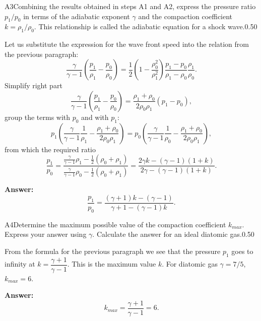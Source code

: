 \documentclass[11pt,a4paper]{article}
\begin{document}
\begin{solcard}{A3}{Combining the results obtained in steps A1 and A2, express the pressure ratio $p_1/p_0$ in terms of the adiabatic exponent $\gamma$ and the compaction coefficient $k=\rho_1/\rho_0$. This relationship is called the adiabatic equation for a shock wave.}{0.50}

Let us substitute the expression for the wave front speed into the relation from the previous paragraph: $$ \frac{\gamma}{\gamma - 1}\left( \frac{p_1}{\rho_1}- \frac{p_0}{\rho_0}\right) = \frac{1}{2}\left(1-\frac{\rho_0^2}{\rho_1^2} \right) \frac{p_1- p_0}{\rho_1 - \rho_0}\frac{\rho_1}{\rho_0}. $$Simplify right part $$ \frac{\gamma}{\gamma - 1}\left( \frac{p_1}{\rho_1}- \frac{p_0}{\rho_0}\right) = \frac{\rho_1 + \rho_0}{2\rho_0 \rho_1} (p_1 - p_0) , $$group the terms with $p_0$ and with $p_1$: $$ p_1\left(\frac{\gamma}{\gamma - 1} \frac{1}{\rho_1} -\frac{\rho_1 + \rho_0}{2 \rho_0 \rho_1} \right) = p_0\left(\frac{\gamma}{\gamma - 1} \frac{1}{\rho_0} - \frac{\rho_1 + \rho_0}{2 \rho_0 \rho_1} \right), $$from which the required ratio $$ \frac{p_1}{p_0}= \frac{\frac{\gamma}{\gamma - 1} \rho_1 - \frac{1}{2}(\rho_0 + \rho_1)}{\frac{\gamma}{\gamma - 1} \rho_0 - \frac{1}{2}(\rho_0 + \rho_1)} = \frac{2 \gamma k - (\gamma -1) (1 + k)}{2 \gamma - (\gamma - 1)(1 + k) }. $$

\par\smallskip\noindent\textbf{Answer:} $$ \frac{p_1}{p_0} = \frac{(\gamma + 1)k  - (\gamma -1)}{\gamma + 1 - (\gamma - 1)k }. $$
\end{solcard}

\begin{solcard}{A4}{Determine the maximum possible value of the compaction coefficient $k_{max}$. Express your answer using $\gamma$. Calculate the answer for an ideal diatomic gas.}{0.50}

From the formula for the previous paragraph we see that the pressure $p_1$ goes to infinity at $k = \dfrac{\gamma + 1}{\gamma -1}$. This is the maximum value $k$. For diatomic gas $\gamma = 7/5$, $k_{max} = 6$.

\par\smallskip\noindent\textbf{Answer:} $$ k_{max} = \frac{\gamma + 1}{\gamma -1} = 6. $$
\end{solcard}
\end{document}
